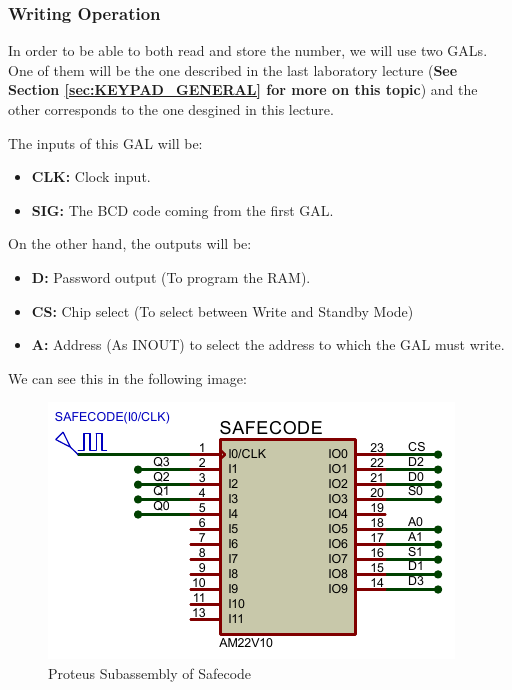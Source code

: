 \subsubsection{Writing Operation}
\label{sec:WRITING_OPERATION}

In order to be able to both read and store the number, we will use two GALs. One of them will be the one described in the last laboratory lecture (\textbf{See Section \ref{sec:KEYPAD_GENERAL} for more on this topic}) and the other corresponds to the one desgined in this lecture. 

The inputs of this GAL will be:

\begin{itemize}
    \item \textbf{CLK:} Clock input.
    \item \textbf{SIG:} The BCD code coming from the first GAL.
\end{itemize}

On the other hand, the outputs will be:

\begin{itemize}
    \item \textbf{D:} Password output (To program the RAM).
    \item \textbf{CS:} Chip select (To select between Write and Standby Mode)
    \item \textbf{A:} Address (As INOUT) to select the address to which the GAL must write.
\end{itemize}

We can see this in the following image:

\begin{figure}[H]
    \centering
    \includegraphics[scale = 1.15]{Graphics/VHDL/Practice 6/SAFECODE/SAFECODE_PROTEUS_GAL.PDF}
    \caption{Proteus Subassembly of Safecode}
    \label{fig:SAFECODE_PROTEUS}
\end{figure}

